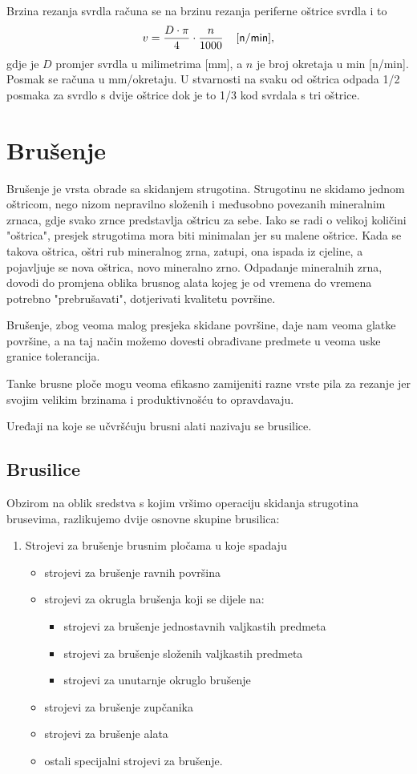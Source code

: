 \documentclass[a4paper,12pt]{article}
\numberwithin{figure}{section}
\begin{document}
\FloatBarrier
Brzina rezanja svrdla računa se na brzinu rezanja periferne oštrice svrdla i to 
\begin{equation*}
v = \frac{D \cdot \pi}{4} \cdot \frac{n}{1000}\hspace{0.4cm} [\mathsf{n/min}],
\end{equation*}
gdje je $D$ promjer svrdla u milimetrima [mm], a $n$ je broj okretaja u min [n/min].\\
Posmak se računa u mm/okretaju. U stvarnosti na svaku od oštrica odpada 1/2 posmaka za svrdlo s dvije oštrice dok je to 1/3 kod svrdala s tri oštrice.
\section{Brušenje}
Brušenje je vrsta obrade sa skidanjem strugotina. Strugotinu ne skidamo jednom oštricom, nego nizom nepravilno složenih i međusobno povezanih mineralnim zrnaca, gdje svako zrnce predstavlja oštricu za sebe. Iako se radi o velikoj količini "oštrica", presjek strugotima mora biti minimalan jer su malene oštrice. Kada se takova oštrica, oštri rub mineralnog zrna, zatupi, ona ispada iz cjeline, a pojavljuje se nova oštrica, novo mineralno zrno. Odpadanje mineralnih zrna, dovodi do promjena oblika brusnog alata kojeg je od vremena do vremena potrebno "prebrušavati", dotjerivati kvalitetu površine.\par 
Brušenje, zbog veoma malog presjeka skidane površine, daje nam veoma glatke površine, a na taj način možemo dovesti obrađivane predmete u veoma uske granice tolerancija. \par
Tanke brusne ploče mogu veoma efikasno zamijeniti razne vrste pila za rezanje jer svojim velikim brzinama i produktivnošću to opravdavaju. \par
Uređaji na koje se učvršćuju brusni alati nazivaju se brusilice.
\subsection{Brusilice}
Obzirom na oblik sredstva s kojim vršimo operaciju skidanja strugotina brusevima, razlikujemo dvije osnovne skupine brusilica:
\begin{enumerate}
\item Strojevi za brušenje brusnim pločama u koje spadaju
\begin{itemize}
\item strojevi za brušenje ravnih površina
\item strojevi za okrugla brušenja koji se dijele na:
\begin{itemize}
\item strojevi za brušenje jednostavnih valjkastih predmeta
\item strojevi za brušenje složenih valjkastih predmeta
\item strojevi za unutarnje okruglo brušenje
\end{itemize}
\item strojevi za brušenje zupčanika
\item strojevi za brušenje alata
\item ostali specijalni strojevi za brušenje.
\end{itemize}
\end{enumerate}
\end{document}
